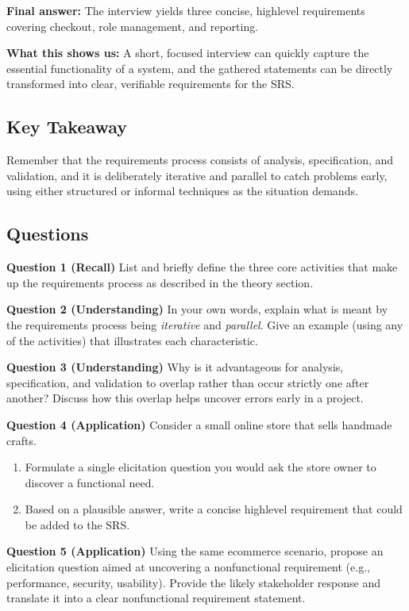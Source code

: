 \documentclass[12pt, a4paper]{article}
\begin{document}
\textbf{Final answer:} The interview yields three concise, highlevel requirements covering checkout, role management, and reporting.  

\textbf{What this shows us:} A short, focused interview can quickly capture the essential functionality of a system, and the gathered statements can be directly transformed into clear, verifiable requirements for the SRS.

\subsection{Key Takeaway}
Remember that the requirements process consists of analysis, specification, and validation, and it is deliberately iterative and parallel to catch problems early, using either structured or informal techniques as the situation demands.

\subsection*{Questions}
\textbf{Question 1 (Recall)}  
List and briefly define the three core activities that make up the requirements process as described in the theory section.

\newpage

\textbf{Question 2 (Understanding)}  
In your own words, explain what is meant by the requirements process being \emph{iterative} and \emph{parallel}. Give an example (using any of the activities) that illustrates each characteristic.

\newpage

\textbf{Question 3 (Understanding)}  
Why is it advantageous for analysis, specification, and validation to overlap rather than occur strictly one after another? Discuss how this overlap helps uncover errors early in a project.

\newpage

\textbf{Question 4 (Application)}  
Consider a small online store that sells handmade crafts.  
\begin{enumerate}
\item Formulate a single elicitation question you would ask the store owner to discover a functional need.  
\item Based on a plausible answer, write a concise highlevel requirement that could be added to the SRS.
\end{enumerate}

\newpage

\textbf{Question 5 (Application)}  
Using the same ecommerce scenario, propose an elicitation question aimed at uncovering a nonfunctional requirement (e.g., performance, security, usability).  
Provide the likely stakeholder response and translate it into a clear nonfunctional requirement statement.
\end{document}
